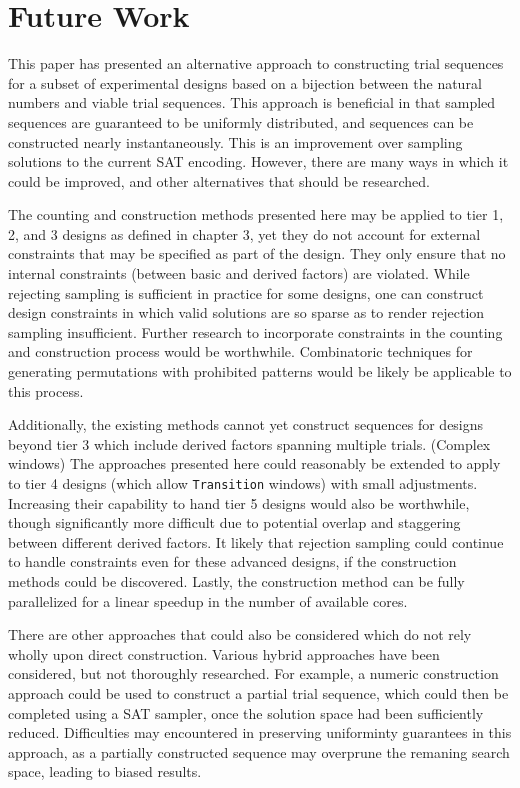 
\chapter{Future Work}

This paper has presented an alternative approach to constructing trial sequences for a subset of experimental designs based on a bijection between the natural numbers and viable trial sequences. This approach is beneficial in that sampled sequences are guaranteed to be uniformly distributed, and sequences can be constructed nearly instantaneously. This is an improvement over sampling solutions to the current SAT encoding. However, there are many ways in which it could be improved, and other alternatives that should be researched.

The counting and construction methods presented here may be applied to tier 1, 2, and 3 designs as defined in chapter 3, yet they do not account for external constraints that may be specified as part of the design. They only ensure that no internal constraints (between basic and derived factors) are violated. While rejecting sampling is sufficient in practice for some designs, one can construct design constraints in which valid solutions are so sparse as to render rejection sampling insufficient. Further research to incorporate constraints in the counting and construction process would be worthwhile. Combinatoric techniques for generating permutations with prohibited patterns would be likely be applicable to this process.

Additionally, the existing methods cannot yet construct sequences for designs beyond tier 3 which include derived factors spanning multiple trials. (Complex windows) The approaches presented here could reasonably be extended to apply to tier 4 designs (which allow \texttt{Transition} windows) with small adjustments. Increasing their capability to hand tier 5 designs would also be worthwhile, though significantly more difficult due to potential overlap and staggering between different derived factors. It likely that rejection sampling could continue to handle constraints even for these advanced designs, if the construction methods could be discovered. Lastly, the construction method can be fully parallelized for a linear speedup in the number of available cores.

There are other approaches that could also be considered which do not rely wholly upon direct construction. Various hybrid approaches have been considered, but not thoroughly researched. For example, a numeric construction approach could be used to construct a partial trial sequence, which could then be completed using a SAT sampler, once the solution space had been sufficiently reduced. Difficulties may encountered in preserving uniforminty guarantees in this approach, as a partially constructed sequence may overprune the remaning search space, leading to biased results.


